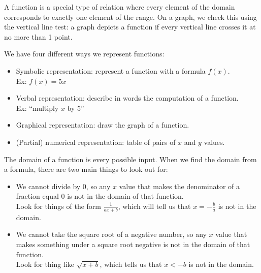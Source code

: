 \documentclass{article}
\begin{document}
A function is a special type of relation where every element of the domain corresponds to exactly one element of the range. On a graph, we check this using the vertical line test: a graph depicts a function if every vertical line crosses it at no more than 1 point.

We have four different ways we represent functions:
\begin{itemize}
    \item Symbolic representation: represent a function with a formula $f(x)$.\\Ex: $f(x)=5x$
    \item Verbal representation: describe in words the computation of a function.\\Ex: ``multiply $x$ by 5''
    \item Graphical representation: draw the graph of a function.
    \item (Partial) numerical representation: table of pairs of $x$ and $y$ values.
\end{itemize}

The domain of a function is every possible input. When we find the domain from a formula, there are two main things to look out for:
\begin{itemize}
    \item We cannot divide by 0, so any $x$ value that makes the denominator of a fraction equal $0$ is not in the domain of that function.\\Look for things of the form $\frac{1}{ax+b}$, which will tell us that $x=-\frac{b}{a}$ is not in the domain.
    \item We cannot take the square root of a negative number, so any $x$ value that makes something under a square root negative is not in the domain of that function.\\Look for thing like $\sqrt{x+b}$, which tells us that $x<-b$ is not in the domain.
\end{itemize}
\end{document}
